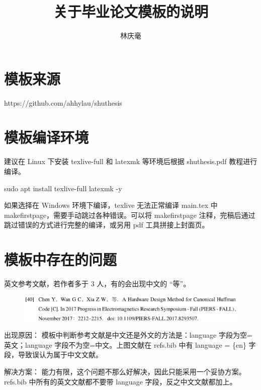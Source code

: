 \documentclass{article}
\begin{document}
\author{林庆毫}
\title{关于毕业论文模板的说明}
\maketitle
\tableofcontents
\newpage
{}

\section{模板来源}
https://github.com/ahhylau/shuthesis

\section{模板编译环境}
建议在 Linux 下安装 texlive-full 和 latexmk 等环境后根据 shuthesis.pdf 教程进行编译。
\begin{framed}
    sudo apt install texlive-full latexmk -y
\end{framed}

如果选择在 Windows 环境下编译，texlive 无法正常编译 main.tex 中 makefirstpage，需要手动跳过各种错误。可以将 makefirstpage 注释，完稿后通过跳过错误的方式进行完整的编译，或另用 pdf 工具拼接上封面页。

\section{模板中存在的问题}
英文参考文献，若作者多于 3 人，有的会出现中文的 “等”。
\begin{figure}[h]
    \centering
    \includegraphics[scale=0.7]{../assets/images/2021-05-27-10-43-57.png}
\end{figure}

出现原因：
模板中判断参考文献是中文还是外文的方法是：language 字段为空=英文；language 字段不为空=中文。上图文献在 refs.bib 中有 language = \{en\} 字段，导致误认为属于中文文献。

解决方案：
能力有限，这个问题不那么好解决，因此只能采用一个妥协方案。
refs.bib 中所有的英文文献都不要带 language 字段，反之中文文献都加上。
\end{document}
